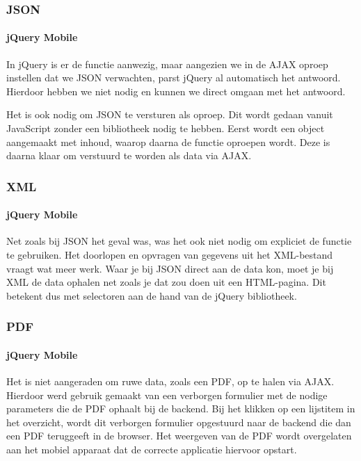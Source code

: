 \subsubsection{JSON}

\paragraph{jQuery Mobile} 
In jQuery is er de functie  aanwezig, maar aangezien we in de AJAX oproep instellen dat we JSON verwachten, parst jQuery al automatisch het antwoord. Hierdoor hebben we  niet nodig en kunnen we direct omgaan met het antwoord.

Het is ook nodig om JSON te versturen als oproep. Dit wordt gedaan vanuit JavaScript zonder een bibliotheek nodig te hebben. Eerst wordt een object aangemaakt met inhoud, waarop daarna de functie  oproepen wordt. Deze is daarna klaar om verstuurd te worden als data via AJAX.

\subsubsection{XML}

\paragraph{jQuery Mobile} 
Net zoals bij JSON het geval was, was het ook niet nodig om expliciet de  functie te gebruiken. Het doorlopen en opvragen van gegevens uit het XML-bestand vraagt wat meer werk. Waar je bij JSON direct aan de data kon, moet je bij XML de data ophalen net zoals je dat zou doen uit een HTML-pagina. Dit betekent dus met selectoren aan de hand van de jQuery bibliotheek.

\subsubsection{PDF}

\paragraph{jQuery Mobile} 
Het is niet aangeraden om ruwe data, zoals een PDF, op te halen via AJAX. Hierdoor werd gebruik gemaakt van een verborgen formulier met de nodige parameters die de PDF ophaalt bij de backend. Bij het klikken op een lijstitem in het overzicht, wordt dit verborgen formulier opgestuurd naar de backend die dan een PDF teruggeeft in de browser. Het weergeven van de PDF wordt overgelaten aan het mobiel apparaat dat de correcte applicatie hiervoor opstart.

